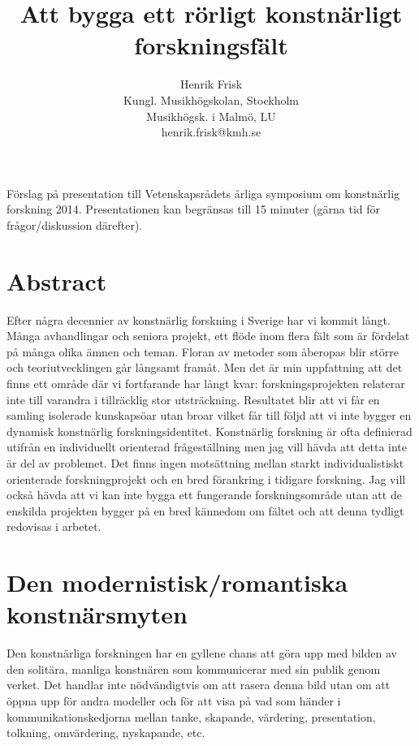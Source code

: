 \documentclass{article}
\begin{document}
\title{Att bygga ett rörligt konstnärligt forskningsfält}
\author{Henrik Frisk\\Kungl. Musikhögskolan, Stockholm\\Musikhögsk. i Malmö, LU\\{\small henrik.frisk@kmh.se}}
\date{}

\maketitle

\noindent
Förslag på presentation till Vetenskapsrådets årliga symposium om konstnärlig forskning 2014. Presentationen kan begränsas till 15 minuter (gärna tid för frågor/diskussion därefter). 

\section*{Abstract}
Efter några decennier av konstnärlig forskning i Sverige har vi kommit långt. Många avhandlingar och seniora projekt, ett flöde inom flera fält som är fördelat på många olika ämnen och teman. Floran av metoder som åberopas blir större och teoriutvecklingen går långsamt framåt. Men det är min uppfattning att det finns ett område där vi fortfarande har långt kvar: forskningsprojekten relaterar inte till varandra i tillräcklig stor utsträckning. Resultatet blir att vi får en samling isolerade kunskapsöar utan broar vilket får till följd att vi inte bygger en dynamisk konstnärlig forskningsidentitet. Konstnärlig forskning är ofta definierad utifrån en individuellt orienterad frågeställning men jag vill hävda att detta inte är del av problemet. Det finns ingen motsättning mellan starkt individualistiskt orienterade forskningprojekt och en bred förankring i tidigare forskning. Jag vill också hävda att vi kan inte bygga ett fungerande forskningsområde utan att de enskilda projekten bygger på en bred kännedom om fältet och att denna tydligt redovisas i arbetet. 

\section{Den modernistisk/romantiska konstnärsmyten}
Den konstnärliga forskningen har en gyllene chans att göra upp med bilden av den solitära, manliga konstnären som kommunicerar med sin publik genom verket. Det handlar inte nödvändigtvis om att rasera denna bild utan om att öppna upp för andra modeller och för att visa på vad som händer i kommunikationskedjorna mellan tanke, skapande, värdering, presentation, tolkning, omvärdering, nyskapande, etc. 
\end{document}
